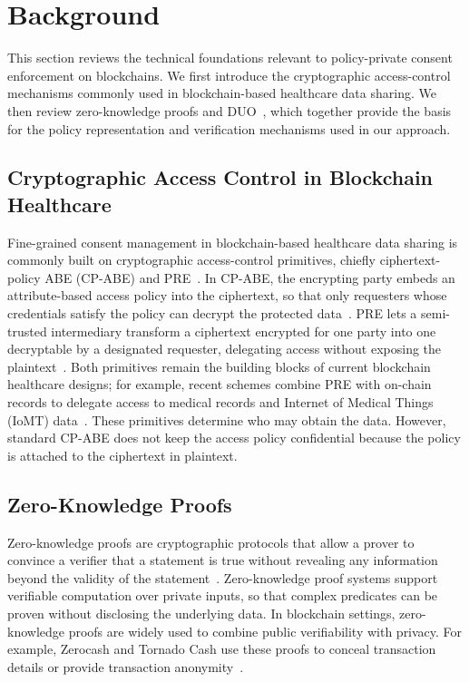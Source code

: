 \section{Background}
\label{sec:background}
This section reviews the technical foundations relevant to policy-private consent enforcement on blockchains. We first introduce the cryptographic access-control mechanisms commonly used in blockchain-based healthcare data sharing. We then review zero-knowledge proofs and DUO~\cite{dyke2016consent}, which together provide the basis for the policy representation and verification mechanisms used in our approach.

\subsection{Cryptographic Access Control in Blockchain Healthcare}
\label{subsec:crypto-access}
Fine-grained consent management in blockchain-based healthcare data sharing is commonly built on cryptographic access-control primitives, chiefly ciphertext-policy ABE (CP-ABE) and PRE~\cite{bethencourt2007ciphertext, ateniese2006improved,ullah2023survey}.
In CP-ABE, the encrypting party embeds an attribute-based access policy into the ciphertext, so that only requesters whose credentials satisfy the policy can decrypt the protected data~\cite{ibraimi2009ciphertext}.
PRE lets a semi-trusted intermediary transform a ciphertext encrypted for one party into one decryptable by a designated requester, delegating access without exposing the plaintext~\cite{ateniese2006improved}.
Both primitives remain the building blocks of current blockchain healthcare designs; for example, recent schemes combine PRE with on-chain records to delegate access to medical records and Internet of Medical Things (IoMT) data~\cite{pei2024proxy,zhou2024secure}.
These primitives determine who may obtain the data.
However, standard CP-ABE does not keep the access policy confidential because the policy is attached to the ciphertext in plaintext.


\subsection{Zero-Knowledge Proofs}
Zero-knowledge proofs are cryptographic protocols that allow a prover to convince a verifier that a statement is true without revealing any information beyond the validity of the statement~\cite{groth2016size}.
Zero-knowledge proof systems support verifiable computation over private inputs, so that complex predicates can be proven without disclosing the underlying data.
In blockchain settings, zero-knowledge proofs are widely used to combine public verifiability with privacy.
For example, Zerocash and Tornado Cash use these proofs to conceal transaction details or provide transaction anonymity~\cite{sasson2014zerocash, nadler2023tornado}.

